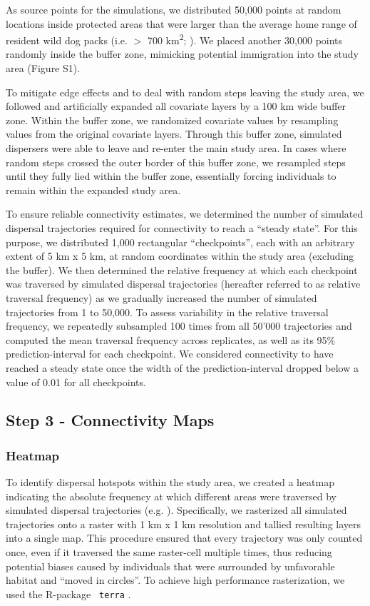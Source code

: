 \documentclass[abstract=on,10pt,a4paper,bibliography=totocnumbered]{article}
\begin{document}
As source points for the simulations, we distributed 50,000 points at random
locations inside protected areas that were larger than the average home range of
resident wild dog packs (i.e. \(>\) 700 km\textsuperscript{2};
\citealp{Pomilia.2015}). We placed another 30,000 points randomly inside the
buffer zone, mimicking potential immigration into the study area (Figure S1).

To mitigate edge effects and to deal with random steps leaving the study area,
we followed \cite{Koen.2010} and artificially expanded all covariate layers by a
100 km wide buffer zone. Within the buffer zone, we randomized covariate values
by resampling values from the original covariate layers. Through this buffer
zone, simulated dispersers were able to leave and re-enter the main study area.
In cases where random steps crossed the outer border of this buffer zone, we
resampled steps until they fully lied within the buffer zone, essentially
forcing individuals to remain within the expanded study area.

To ensure reliable connectivity estimates, we determined the number of simulated
dispersal trajectories required for connectivity to reach a ``steady state''.
For this purpose, we distributed 1,000 rectangular ``checkpoints'', each with an
arbitrary extent of 5 km x 5 km, at random coordinates within the study area
(excluding the buffer). We then determined the relative frequency at which each
checkpoint was traversed by simulated dispersal trajectories (hereafter referred
to as relative traversal frequency) as we gradually increased the number of
simulated trajectories from 1 to 50,000. To assess variability in the relative
traversal frequency, we repeatedly subsampled 100 times from all 50'000
trajectories and computed the mean traversal frequency across replicates, as
well as its 95\% prediction-interval for each checkpoint. We considered
connectivity to have reached a steady state once the width of the
prediction-interval dropped below a value of 0.01 for all checkpoints.

\subsection{Step 3 - Connectivity Maps}
\subsubsection{Heatmap}
To identify dispersal hotspots within the study area, we created a heatmap
indicating the absolute frequency at which different areas were traversed by
simulated dispersal trajectories (e.g. \citealp{Peer.2008, Hauenstein.2019,
Zeller.2020}). Specifically, we rasterized all simulated trajectories onto a
raster with 1 km x 1 km resolution and tallied resulting layers into a single
map. This procedure ensured that every trajectory was only counted once, even if
it traversed the same raster-cell multiple times, thus reducing potential biases
caused by individuals that were surrounded by unfavorable habitat and ``moved in
circles''. To achieve high performance rasterization, we used the R-package {\tt
terra} \citep{Hijmans.2021b}.
\end{document}
